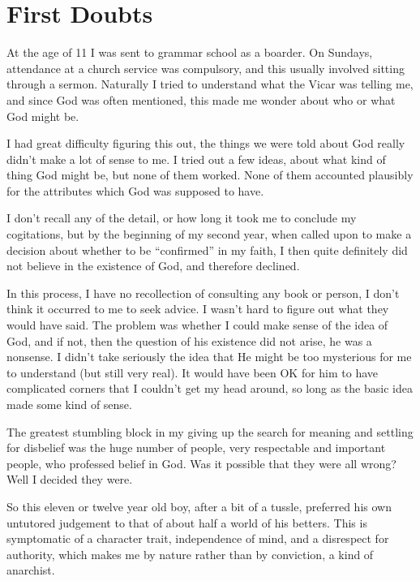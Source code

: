 
\section{First Doubts}

At the age of 11 I was sent to grammar school as a boarder.
On Sundays, attendance at a church service was compulsory, and this usually involved sitting through a sermon.
Naturally I tried to understand what the Vicar was telling me, and since God was often mentioned, this made me wonder about who or what God might be.

I had great difficulty figuring this out, the things we were told about God really didn't make a lot of sense to me.
I tried out a few ideas, about what kind of thing God might be, but none of them worked.
None of them accounted plausibly for the attributes which God was supposed to have.

I don't recall any of the detail, or how long it took me to conclude my cogitations, but by the beginning of my second year, when called upon to make a decision about whether to be ``confirmed'' in my faith, I then quite definitely did not believe in the existence of God, and therefore declined.

In this process, I have no recollection of consulting any book or person, I don't think it occurred to me to seek advice.
I wasn't hard to figure out what they would have said.
The problem was whether I could make sense of the idea of God, and if not, then the question of his existence did not arise, he was a nonsense.
I didn't take seriously the idea that He might be too mysterious for me to understand (but still very real).
It would have been OK for him to have complicated corners that I couldn't get my head around, so long as the basic idea made some kind of sense.

The greatest stumbling block in my giving up the search for meaning and settling for disbelief was the huge number of people, very respectable and important people, who professed belief in God.
Was it possible that they were all wrong?
Well I decided they were.

So this eleven or twelve year old boy, after a bit of a tussle, preferred his own untutored judgement to that of about half a world of his betters.
This is symptomatic of a character trait, independence of mind, and a disrespect for authority, which makes me by nature rather than by conviction, a kind of anarchist.

